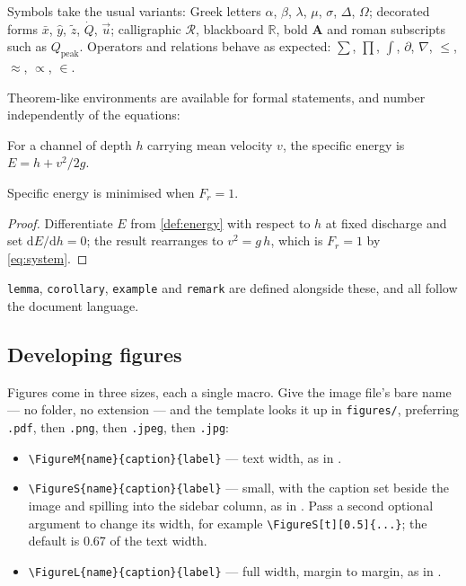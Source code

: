 Symbols take the usual variants: Greek letters $\alpha$, $\beta$,
$\lambda$, $\mu$, $\sigma$, $\Delta$, $\Omega$; decorated forms
$\bar{x}$, $\hat{y}$, $\tilde{z}$, $\dot{Q}$, $\vec{u}$; calligraphic
$\mathcal{R}$, blackboard $\mathbb{R}$, bold $\mathbf{A}$ and
roman subscripts such as $Q_{\mathrm{peak}}$. Operators and
relations behave as expected: $\sum$, $\prod$, $\int$,
$\partial$, $\nabla$, $\leq$, $\approx$, $\propto$, $\in$.

Theorem-like environments are available for formal statements,
and number independently of the equations:

\begin{definition}
    \label{def:energy}
    For a channel of depth $h$ carrying mean velocity $v$, the
    specific energy is $E = h + v^{2}/2g$.
\end{definition}

\begin{theorem}
    \label{thm:critical}
    Specific energy is minimised when $F_{r} = 1$.
\end{theorem}

\begin{proof}
    Differentiate $E$ from \cref{def:energy} with respect to $h$
    at fixed discharge and set $\mathrm{d}E/\mathrm{d}h = 0$;
    the result rearranges to $v^{2} = g\,h$, which is
    $F_{r} = 1$ by \cref{eq:system}.
\end{proof}

\begin{remark}
    \texttt{lemma}, \texttt{corollary}, \texttt{example} and
    \texttt{remark} are defined alongside these, and all follow
    the document language.
\end{remark}

\lipsum[5-8]

\subsection{Developing figures} \label{sec:figures}

Figures come in three sizes, each a single macro. Give the image
file's bare name --- no folder, no extension --- and the template
looks it up in \texttt{figures/}, preferring \texttt{.pdf}, then
\texttt{.png}, then \texttt{.jpeg}, then \texttt{.jpg}:

\begin{itemize}
  \item \verb|\FigureM{name}{caption}{label}| --- text width,
        as in .
  \item \verb|\FigureS{name}{caption}{label}| --- small, with the
        caption set beside the image and spilling into the
        sidebar column, as in . Pass a second
        optional argument to change its width, for example
        \verb|\FigureS[t][0.5]{...}|; the default is 0.67 of the
        text width.
  \item \verb|\FigureL{name}{caption}{label}| --- full width,
        margin to margin, as in .
\end{itemize}

